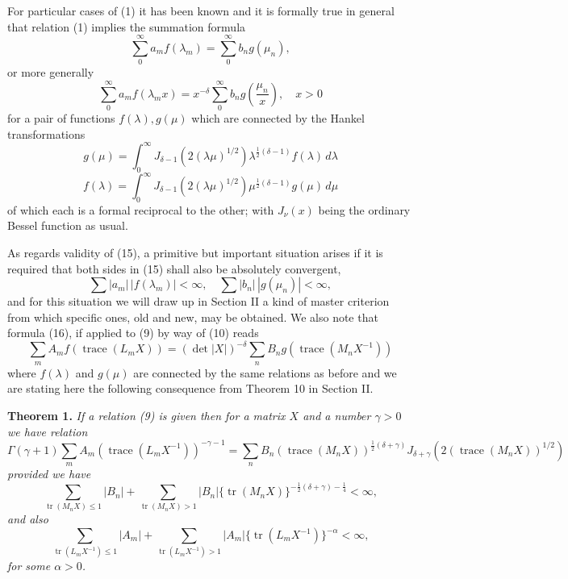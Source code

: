 \documentclass[12pt]{article}
\begin{document}
For particular cases of (1) it has been known and it is formally true in general that relation (1) implies the summation formula
\begin{equation}
\sum_0^{\infty} a_m f(\lambda_m) = \sum_0^{\infty} b_n g(\mu_n),
\tag{15}
\end{equation}
or more generally
\begin{equation}
\sum_0^{\infty} a_m f(\lambda_m x) = x^{-\delta} \sum_0^{\infty} b_n g \left( \frac{\mu_n}{x} \right), \quad x > 0
\tag{16}
\end{equation}
for a pair of functions \(f(\lambda), g(\mu)\) which are connected by the Hankel transformations
\begin{equation}
g(\mu) = \int_0^{\infty} J_{\delta-1}(2(\lambda\mu)^{1/2}) \lambda^{\frac{1}{2}(\delta-1)} f(\lambda) \, d\lambda
\tag{17}
\end{equation}
\begin{equation}
f(\lambda) = \int_0^{\infty} J_{\delta-1}(2(\lambda\mu)^{1/2}) \mu^{\frac{1}{2}(\delta-1)} g(\mu) \, d\mu
\tag{18}
\end{equation}
of which each is a formal reciprocal to the other; with \(J_\nu(x)\) being the ordinary Bessel function as usual.

As regards validity of (15), a primitive but important situation arises if it is required that both sides in (15) shall also be absolutely convergent,
\begin{equation}
\sum |a_m|\,|f(\lambda_m)| < \infty, \quad \sum |b_n|\,|g(\mu_n)| < \infty,
\tag{19}
\end{equation}
and for this situation we will draw up in Section II a kind of master criterion from which specific ones, old and new, may be obtained. We also note that formula (16), if applied to (9) by way of (10) reads
\begin{equation}
\sum_m A_m f(\operatorname{trace}(L_m X)) = (\det |X|)^{-\delta} \sum_n B_n g(\operatorname{trace}(M_n X^{-1}))
\tag{20}
\end{equation}
where \(f(\lambda)\) and \(g(\mu)\) are connected by the same relations as before and we are stating here the following consequence from Theorem 10 in Section II.

\medskip

\noindent\textbf{Theorem 1.} \emph{If a relation (9) is given then for a matrix \(X\) and a number \(\gamma > 0\) we have relation}
\begin{equation}
\Gamma(\gamma + 1) \sum_m A_m (\operatorname{trace}(L_m X^{-1}))^{-\gamma-1} = \sum_n B_n (\operatorname{trace}(M_n X))^{\frac{1}{2}(\delta+\gamma)} J_{\delta+\gamma}(2(\operatorname{trace}(M_n X))^{1/2})
\tag{21}
\end{equation}
\emph{provided we have}
\[
\sum_{\operatorname{tr}(M_n X) \le 1} |B_n| + \sum_{\operatorname{tr}(M_n X) > 1} |B_n| \{ \operatorname{tr}(M_n X) \}^{-\frac{1}{2}(\delta+\gamma)-\frac{1}{4}} < \infty,
\]
\emph{and also}
\[
\sum_{\operatorname{tr}(L_m X^{-1}) \le 1} |A_m| + \sum_{\operatorname{tr}(L_m X^{-1}) > 1} |A_m| \{ \operatorname{tr}(L_m X^{-1}) \}^{-\alpha} < \infty,
\]
\emph{for some \(\alpha > 0\).}
\end{document}
